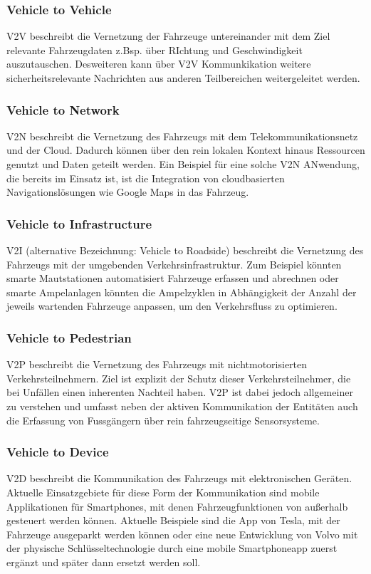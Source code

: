     \subsubsection{Vehicle to Vehicle}
    V2V beschreibt die Vernetzung der Fahrzeuge untereinander mit dem Ziel relevante Fahrzeugdaten z.Bsp. über RIchtung und Geschwindigkeit auszutauschen.
    Desweiteren kann über V2V Kommunkikation weitere sicherheitsrelevante Nachrichten aus anderen Teilbereichen weitergeleitet werden.

    \subsubsection{Vehicle to Network}
    V2N beschreibt die Vernetzung des Fahrzeugs mit dem Telekommunikationsnetz und der Cloud. Dadurch können über den
    rein lokalen Kontext hinaus Ressourcen genutzt und Daten geteilt werden. Ein Beispiel für eine solche V2N ANwendung, die bereits
    im Einsatz ist, ist die Integration von cloudbasierten Navigationslösungen wie Google Maps in das Fahrzeug.
    
    \subsubsection{Vehicle to Infrastructure}
    V2I (alternative Bezeichnung: Vehicle to Roadside) beschreibt die Vernetzung des Fahrzeugs mit der umgebenden Verkehrsinfrastruktur. Zum Beispiel könnten smarte
    Mautstationen automatisiert Fahrzeuge erfassen und abrechnen oder smarte Ampelanlagen könnten die Ampelzyklen in Abhängigkeit
    der Anzahl der jeweils wartenden Fahrzeuge anpassen, um den Verkehrsfluss zu optimieren. 

    \subsubsection{Vehicle to Pedestrian}
    V2P beschreibt die Vernetzung des Fahrzeugs mit nichtmotorisierten Verkehrsteilnehmern. Ziel ist explizit der
    Schutz dieser Verkehrsteilnehmer, die bei Unfällen einen inherenten Nachteil haben. V2P ist dabei jedoch allgemeiner
    zu verstehen und umfasst neben der aktiven Kommunikation der Entitäten auch die Erfassung von Fussgängern über rein
    fahrzeugseitige Sensorsysteme.

    \subsubsection{Vehicle to Device}
    V2D beschreibt die Kommunikation des Fahrzeugs mit elektronischen Geräten. Aktuelle Einsatzgebiete für diese Form der Kommunikation
    sind mobile Applikationen für Smartphones, mit denen Fahrzeugfunktionen von außerhalb gesteuert werden können. Aktuelle Beispiele
    sind die App von Tesla, mit der Fahrzeuge ausgeparkt werden können oder eine neue Entwicklung von Volvo mit der physische Schlüsseltechnologie
    durch eine mobile Smartphoneapp zuerst ergänzt und später dann ersetzt werden soll. ~\cite{.BP05}
     
